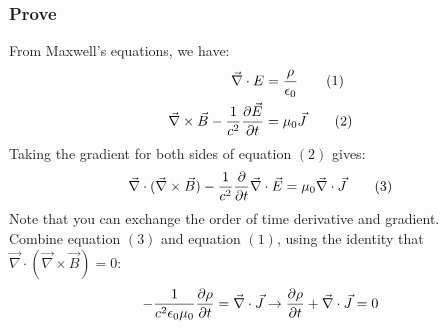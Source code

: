\documentclass{article}
\begin{document}
\subsubsection*{Prove}
From Maxwell's equations, we have:
\begin{align*}
  \vec{\nabla} \cdot  E &= \frac{\rho}{\epsilon_0} \tag{1}\\ 
  \vec{\nabla}  \times  \vec{B} - \frac{1}{c^2} \pdv{\vec{E}}{t} &= \mu_0 \vec{J} \tag{2}
\end{align*}
Taking the gradient for both sides of equation $(2)$ gives:
\begin{equation*}
  \vec{\nabla } \cdot (\vec{\nabla } \times  \vec{B} )- \frac{1}{c^2}\pdv{t}\vec{\nabla }\cdot \vec{E}  = \mu_0 \vec{\nabla} \cdot  \vec{J} \tag{3}
\end{equation*}
Note that you can exchange the order of time derivative and gradient.\\ 
Combine equation $(3)$ and equation $(1)$, using the identity that $\vec{\nabla} \cdot (\vec{\nabla } \times \vec{B}) = 0 $:
\begin{equation*}
  - \frac{1}{c^2 \epsilon_0 \mu_0} \pdv{\rho}{t} =  \vec{\nabla} \cdot \vec{J}    \to \pdv{\rho}{t} + \vec{\nabla}\cdot \vec{J}= 0  
\end{equation*}
\end{document}
